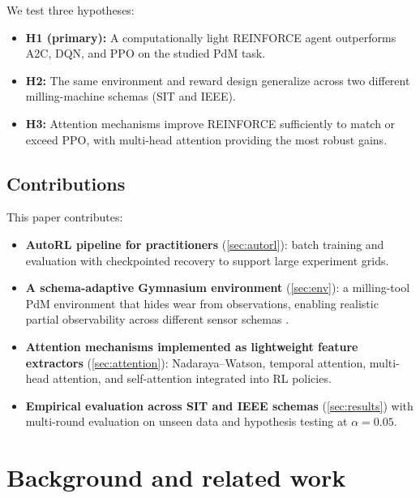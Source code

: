 \documentclass[11pt]{article}
\begin{document}
We test three hypotheses:
\begin{itemize}
	\item \textbf{H1 (primary):} A computationally light REINFORCE agent outperforms A2C, DQN, and PPO on the studied PdM task.
	\item \textbf{H2:} The same environment and reward design generalize across two different milling-machine schemas (SIT and IEEE).
	\item \textbf{H3:} Attention mechanisms improve REINFORCE sufficiently to match or exceed PPO, with multi-head attention providing the most robust gains.
\end{itemize}

\subsection{Contributions}
\label{sec:contrib}
This paper contributes:
\begin{itemize}
	\item \textbf{AutoRL pipeline for practitioners} (\cref{sec:autorl}): batch training and evaluation with checkpointed recovery to support large experiment grids.
	\item \textbf{A schema-adaptive Gymnasium environment} (\cref{sec:env}): a milling-tool PdM environment that hides wear from observations, enabling realistic partial observability across different sensor schemas \parencite{Gymnasium2023}.
	\item \textbf{Attention mechanisms implemented as lightweight feature extractors} (\cref{sec:attention}): Nadaraya--Watson, temporal attention, multi-head attention, and self-attention integrated into RL policies.
	\item \textbf{Empirical evaluation across SIT and IEEE schemas} (\cref{sec:results}) with multi-round evaluation on unseen data and hypothesis testing at $\alpha=0.05$.
\end{itemize}

\section{Background and related work}
\label{sec:background}
\end{document}
